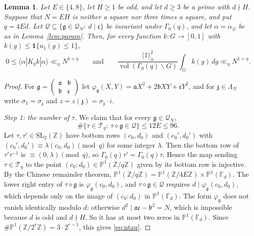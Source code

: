 \documentclass[11pt]{amsart}
\newtheorem{lemma}[theorem]{Lemma}
\theoremstyle{remark}
\theoremstyle{definition}
\numberwithin{equation}{section}
\newcommand{\Qc}{\mathcal{Q}}
\newcommand{\Tc}{\mathcal{T}}
\newcommand{\Z}{\mathbb{Z}}
\newcommand{\ga}{\mathfrak{a}}
\newcommand{\gb}{\mathfrak{b}}
\newcommand{\gc}{\mathfrak{c}}
\newcommand{\fg}{\mathfrak{g}}
\newcommand{\gz}{\mathfrak{z}}
\newcommand{\vol}{\operatorname{vol}}
\newcommand{\SL}{\mathrm{SL}}
\newcommand{\one}{\mathbf{1}}
\newcommand{\br}[1]{\langle #1\rangle}
\begin{document}
\begin{lemma}\label{lem:K2}
Let $E\in\{4,8\}$, let $H\ge1$ be odd, and let $d\ge3$ be a prime with $d\nmid H$. Suppose that $N=EH$ is neither a square nor three times a square, and put $q=4Ed$. Let $\Qc\subseteq\{\fg\in\Qc_N:\ d\mid\gc\}$ be invariant under $\Gamma_0(q)$, and let $\alpha=\alpha_\Qc$ be as in Lemma~\ref{lem:param}. Then, for every function $k:G\to[0,1]$ with $k(g)\le\one\{u_1(g)\le1\}$,
\[
0\le\br{\alpha|K_qk|\alpha}\ll_\eta N^{1+\eta}\qquad\text{and}\qquad\frac{\br{1}_\alpha^2}{\vol(\Gamma_0(q)\backslash G)}\int_Gk(g)\,dg\ll_\eta N^{1+\eta}.
\]
\end{lemma}

\begin{proof}
For $\fg=\left(\begin{smallmatrix}\ga&\gb\\ \gb&\gc\end{smallmatrix}\right)$ let $\varphi_\fg(X,Y)=\ga X^2+2\gb XY+\gc Y^2$, and for $\gz\in\Lambda_N$ write $\sigma_1=\sigma_\gz$ and $z=z(\gz)=\sigma_\gz\cdot i$.

\emph{Step 1: the number of $\tau$.} We claim that for every $\fg\in\Qc_N$,
\begin{equation}\label{eq:ntau}
\#\{\tau\in\Tc_q:\ \tau\diamond\fg\in\Qc\}\le12E\le96 .
\end{equation}
Let $\tau,\tau'\in\SL_2(\Z)$ have bottom rows $(c_0,d_0)$ and $(c_0',d_0')$ with $(c_0',d_0')\equiv\lambda(c_0,d_0)\pmod q$ for some integer $\lambda$. Then the bottom row of $\tau'\tau^{-1}$ is $\equiv(0,\lambda)\pmod q$, so $\Gamma_0(q)\tau'=\Gamma_0(q)\tau$. Hence the map sending $\tau\in\Tc_q$ to the point $(c_0:d_0)\in\mathbb P^1(\Z/q\Z)$ given by its bottom row is injective. By the Chinese remainder theorem, $\mathbb P^1(\Z/q\Z)=\mathbb P^1(\Z/4E\Z)\times\mathbb P^1(\mathbb F_d)$. The lower right entry of $\tau\diamond\fg$ is $\varphi_\fg(c_0,d_0)$, and $\tau\diamond\fg\in\Qc$ requires $d\mid\varphi_\fg(c_0,d_0)$, which depends only on the image of $(c_0:d_0)$ in $\mathbb P^1(\mathbb F_d)$. The form $\varphi_\fg$ does not vanish identically modulo $d$: otherwise $d^2\mid\ga\gc-\gb^2=N$, which is impossible because $d$ is odd and $d\nmid H$. So it has at most two zeros in $\mathbb P^1(\mathbb F_d)$. Since $\#\mathbb P^1(\Z/2^r\Z)=3\cdot2^{r-1}$, this gives \eqref{eq:ntau}.


\end{proof}
\end{document}
